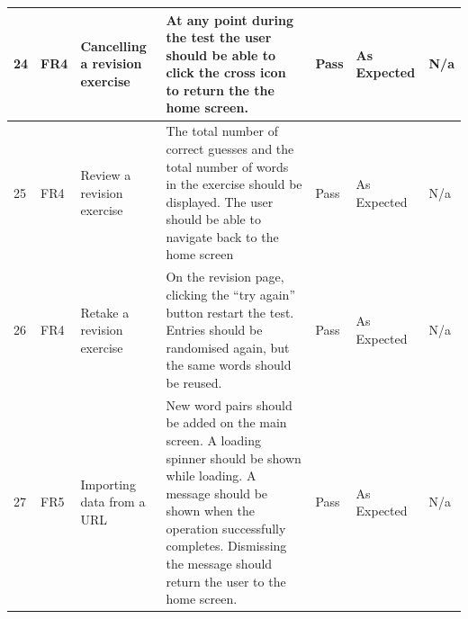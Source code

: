 \documentclass[paper=a4, fontsize=11pt]{scrartcl}	%
\numberwithin{equation}{section}															%
\numberwithin{figure}{section}																%
\numberwithin{table}{section}
\begin{document}
\begin{landscape}
\begin{longtable}{|l|p{2cm}|p{5cm}|p{5cm}|l|p{5cm}|p{5cm}|}
24 & FR4                    & Cancelling a revision exercise                       & At any point during the test the user should be able to click the cross icon to return the the home screen.                                                                                                                                & Pass      & As Expected                                        & N/a                                                                                                                                                                                                                        \\ \hline
25 & FR4                    & Review a revision exercise                           & The total number of correct guesses and the total number of words in the exercise should be displayed. The user should be able to navigate back to the home screen                                                                         & Pass      & As Expected                                        & N/a                                                                                                                                                                                                                        \\ \hline
26 & FR4                    & Retake a revision exercise                           & On the revision page, clicking the “try again” button restart the test. Entries should be randomised again, but the same words should be reused.                                                                                           & Pass      & As Expected                                        & N/a                                                                                                                                                                                                                        \\ \hline
27 & FR5                    & Importing data from a URL                            & New word pairs should be added on the main screen. A loading spinner should be shown while loading. A message should be shown when the operation successfully completes. Dismissing the message should return the user to the home screen. & Pass      & As Expected                                        & N/a                                                                                                                                                                                                                        \\ \hline

\end{longtable}
\end{landscape}
\end{document}
